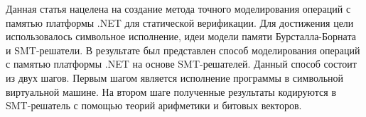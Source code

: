 Данная статья нацелена на создание метода точного моделирования операций с памятью платформы .NET для статической верификации. Для достижения цели использовалось символьное исполнение, идеи модели памяти Бурсталла-Борната и SMT-решатели. В результате был представлен способ моделирования операций с памятью платформы .NET на основе SMT-решателей. Данный способ состоит из двух шагов. Первым шагом является исполнение программы в символьной виртуальной машине. На втором шаге полученные результаты кодируются в SMT-решатель с помощью теорий арифметики и битовых векторов.